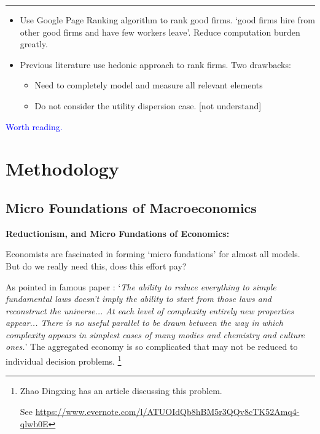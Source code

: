 \documentclass{book}
\theoremstyle{plain}
\theoremstyle{definition}
\newcommand{\myline}{\vspace{3mm} \hrule \vspace{4mm}}
\begin{document}
\myline

\textbf{}

\begin{itemize}
	\item Use Google Page Ranking algorithm to rank good firms. `good firms hire from other good firms and have few workers leave'. Reduce computation burden greatly.
	\item Previous literature use hedonic approach to rank firms. Two drawbacks:
	\begin{itemize}
		\item Need to completely model and measure all relevant elements
		\item Do not consider the utility dispersion case. [not understand]
	\end{itemize}
\end{itemize}

\textcolor{blue}{Worth reading.}








\part{Methodology} %
\label{part:methodology}


\chapter{Micro Foundations of Macroeconomics} %
\label{cha:micro_foundations_of_macroeconomics}


\noindent
\textbf{Reductionism, and Micro Fundations of Economics:}

Economists are fascinated in forming `micro fundations' for almost all models. But do we really need this, does this effort pay? 

As pointed in famous paper \cite{anderson1972:science}: `\textit{The ability to reduce everything to simple fundamental laws doesn't imply the ability to start from those laws and reconstruct the universe... At each level of complexity entirely new properties appear... There is no useful parallel to be drawn between the way in which complexity appears in simplest cases of many modies and chemistry and culture ones.}'
The aggregated economy is so complicated that may not be reduced to individual decision problems.
\footnote{Zhao Dingxing has an article discussing this problem.

See \url{https://www.evernote.com/l/ATUOIdQb8hBM5r3QQv8cTK52Amq4-qlwb0E}}
\end{document}
